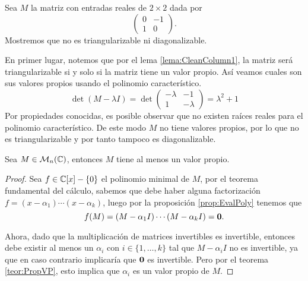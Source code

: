 \begin{example}
  Sea $M$ la matriz con entradas reales de $2\times 2$ dada por 
  \[ \begin{pmatrix} 0 & -1 \\ 1 & 0 \end{pmatrix}. \]
  Mostremos que no es triangularizable ni diagonalizable.

  \examplesolution

  En primer lugar, notemos que por el lema \ref{lema:CleanColumn1}, la matriz será triangularizable si y solo si la matriz tiene un valor propio. Así veamos cuales son sus valores propios usando el polinomio característico.
    \[
      \det(M-\lambda I) = \det \begin{pmatrix} - \lambda & -1 \\ 1 & - \lambda \end{pmatrix}
        = \lambda^2  + 1
    \]
  Por propiedades conocidas, es posible observar que no existen raíces reales para el polinomio característico. De este modo $M$ no tiene valores propios, por lo que no es triangularizable y por tanto tampoco es diagonalizable.
\end{example}


\begin{prop}\label{prop:MComplexHasEV}
  Sea $M \in  \mathcal{M}_n(\mathbb{C})$, entonces $M$ tiene al menos un valor propio.
\end{prop}
\begin{proof}
  Sea $f \in \mathbb{C}[x]-\{0\}$ el polinomio minimal de $M$, por el teorema fundamental del cálculo, sabemos que debe haber alguna factorización $f = (x-\alpha_1)\cdots(x-\alpha_k)$, luego por la proposición \ref{prop:EvalPoly} tenemos que
  \[ f(M) = (M-\alpha_1 I)\cdots(M-\alpha_k I) = \mathbf{0}.\]

  Ahora, dado que la multiplicación de matrices invertibles es invertible, entonces debe existir al menos un $\alpha_i$ con $i \in \{1,\ldots,k\}$ tal que $M-\alpha_i I$ no es invertible, ya que en caso contrario implicaría que $\mathbf{0}$ es invertible. Pero por el teorema \ref{teor:PropVP}, esto implica que $\alpha_i$ es un valor propio de $M$.
\end{proof}

